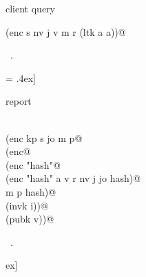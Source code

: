 \documentclass[titlepage,12pt]{article}
\theoremstyle{definition}
\begin{document}
\begin{flushleft} \small
\begin{minipage}{\linewidth} \label{scrap6}
client query\nobreak\ {\footnotesize {}}
\vspace{-1ex}
\begin{list}{}{} \item
\mbox{}\verb@(enc s nv j v m r (ltk a a))@{\NWsep}
\end{list}
\vspace{-1ex}
\footnotesize\addtolength{\baselineskip}{-1ex}
\begin{list}{}{\setlength{\itemsep}{-\parsep}\setlength{\itemindent}{-\leftmargin}}
\item \NWtxtMacroRefIn\ .
\end{list}
\end{minipage}\B = \blob.4ex]
\end{flushleft}
\begin{flushleft} \small
\begin{minipage}{\linewidth} \label{scrap8}
report\nobreak\ {\footnotesize {}}
\vspace{-1ex}
\begin{list}{}{} \item
\mbox{}\verb@@\\
\mbox{}\verb@(enc kp s jo m p@\\
\mbox{}\verb@  (enc@\\
\mbox{}\verb@     (enc "hash"@\\
\mbox{}\verb@        (enc "hash" a v r nv j jo hash)@\\
\mbox{}\verb@         m p hash)@\\
\mbox{}\verb@    (invk i))@\\
\mbox{}\verb@  (pubk v))@{\NWsep}
\end{list}
\vspace{-1ex}
\footnotesize\addtolength{\baselineskip}{-1ex}
\begin{list}{}{\setlength{\itemsep}{-\parsep}\setlength{\itemindent}{-\leftmargin}}
\item \NWtxtMacroRefIn\ .
\end{list}
\end{minipage}\4ex]
\end{flushleft}
\end{document}
